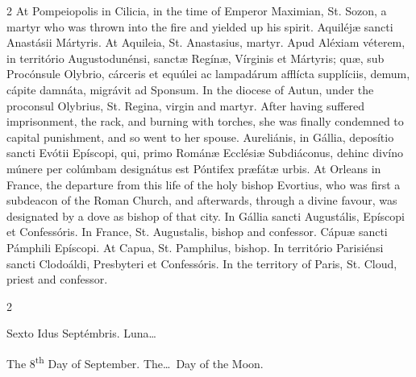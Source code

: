 \begin{paracol}{2}
At Pompeiopolis in Cilicia, in the 
 time of Emperor Maximian, St. Sozon, a martyr who was thrown into the fire 
 and yielded up his spirit.
\switchcolumn*
{}
Aquiléjæ sancti 
 Anastásii Mártyris.
\switchcolumn
{}
At Aquileia, St. Anastasius, martyr.
\switchcolumn*
{}
Apud Aléxiam véterem, 
 in território Augustodunénsi, sanctæ Regínæ, Vírginis et Mártyris; quæ, sub 
 Procónsule Olybrio, cárceris et equúlei ac lampadárum afflícta supplíciis, 
 demum, cápite damnáta, migrávit ad Sponsum.
\switchcolumn
{}
In the diocese of Autun, under the 
 proconsul Olybrius, St. Regina, virgin and martyr. After having 
 suffered imprisonment, the rack, and burning with torches, she was finally 
 condemned to capital punishment, and so went to her spouse.
\switchcolumn*
{}
Aureliánis, in Gállia, 
 deposítio sancti Evótii Epíscopi, qui, primo Románæ Ecclésiæ Subdiáconus, 
 dehinc divíno múnere per colúmbam designátus est Póntifex præfátæ urbis.
\switchcolumn
{}
At Orleans in France, the departure 
 from this life of the holy bishop Evortius, who was first a subdeacon of the 
 Roman Church, and afterwards, through a divine favour, was designated by a 
 dove as bishop of that city.
\switchcolumn*
{}
In Gállia sancti 
 Augustális, Epíscopi et Confessóris.
\switchcolumn
{}
In France, St. Augustalis, bishop 
 and confessor.
\switchcolumn*
{}
Cápuæ sancti Pámphili 
 Epíscopi.
\switchcolumn
{}
At Capua, St. Pamphilus, bishop.
\switchcolumn*
{}
In território Parisiénsi sancti Clodoáldi, Presbyteri et Confessóris.
\switchcolumn
{}
In the territory of Paris, St. 
 Cloud, priest and confessor.
\switchcolumn*
{}
\end{paracol}


\begin{paracol}{2}
\begin{center}{\color{gregoriocolor} Sexto Idus Septémbris. 
 Luna\dots\ }\end{center}
\switchcolumn
{}
\begin{center}{\color{gregoriocolor} The   8\textsuperscript{th} Day of 
 September. The\dots\ Day of the Moon.}\end{center}
\end{paracol}

